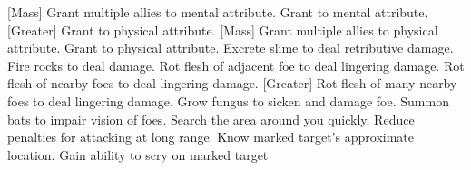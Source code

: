 [Mass]
    {Grant multiple allies  to mental attribute.}
    {Grant  to mental attribute.}
[Greater]
    {Grant  to physical attribute.}
[Mass]
    {Grant multiple allies  to physical attribute.}
    {Grant  to physical attribute.}
    {Excrete slime to deal retributive damage.}
    {Fire rocks to deal damage.}
    {Rot flesh of adjacent foe to deal lingering damage.}
    {Rot flesh of nearby foes to deal lingering damage.}
[Greater]
    {Rot flesh of many nearby foes to deal lingering damage.}
    {Grow fungus to sicken and damage foe.}
    {Summon bats to impair vision of foes.}
    {Search the area around you quickly.}
    {Reduce penalties for attacking at long range.}
    {Know marked target's approximate location.}
    {Gain ability to scry on marked target}
